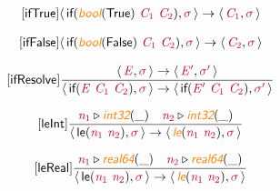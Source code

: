 \documentclass[10pt,leqno,fleqn]{article}
\newcommand{\artVariable}[1]{\mbox{\color{purple}\em #1\/}}
\newcommand{\artConstructor}[1]{\mbox{\sf #1}}
\newcommand{\artSpecial}[1]{\mbox{\color{orange}\sf\em #1}}
\begin{document}
\begin{equation}
\tag*{[\artConstructor{\sf ifTrue}]}
\begin{split}\langle\, \artConstructor{\sf if}(\artSpecial{bool}(\artConstructor{\sf True})\ \artVariable{C$_{1}$}\ \artVariable{C$_{2}$}), \artVariable{$\sigma$}\,\rangle \rightarrow \langle\, \artVariable{C$_{1}$}, \artVariable{$\sigma$}\,\rangle 
\end{split}
\end{equation}

\begin{equation}
\tag*{[\artConstructor{\sf ifFalse}]}
\begin{split}\langle\, \artConstructor{\sf if}(\artSpecial{bool}(\artConstructor{\sf False})\ \artVariable{C$_{1}$}\ \artVariable{C$_{2}$}), \artVariable{$\sigma$}\,\rangle \rightarrow \langle\, \artVariable{C$_{2}$}, \artVariable{$\sigma$}\,\rangle 
\end{split}
\end{equation}

\begin{equation}
\tag*{[\artConstructor{\sf ifResolve}]}
\begin{split}\frac{\langle\, \artVariable{E}, \artVariable{$\sigma$}\,\rangle \rightarrow \langle\, \artVariable{E\/$^\prime$}, \artVariable{$\sigma$\/$^\prime$}\,\rangle }{\langle\, \artConstructor{\sf if}(\artVariable{E}\ \artVariable{C$_{1}$}\ \artVariable{C$_{2}$}), \artVariable{$\sigma$}\,\rangle \rightarrow \langle\, \artConstructor{\sf if}(\artVariable{E\/$^\prime$}\ \artVariable{C$_{1}$}\ \artVariable{C$_{2}$}), \artVariable{$\sigma$\/$^\prime$}\,\rangle }
\end{split}
\end{equation}

\begin{equation}
\tag*{[\artConstructor{\sf leInt}]}
\begin{split}\frac{ \artVariable{n$_{1}$}\triangleright \artSpecial{int32}(\_) \quad  \artVariable{n$_{2}$}\triangleright \artSpecial{int32}(\_) }{\langle\, \artConstructor{\sf le}(\artVariable{n$_{1}$}\ \artVariable{n$_{2}$}), \artVariable{$\sigma$}\,\rangle \rightarrow \langle\, \artSpecial{le}(\artVariable{n$_{1}$}\ \artVariable{n$_{2}$}), \artVariable{$\sigma$}\,\rangle }
\end{split}
\end{equation}

\begin{equation}
\tag*{[\artConstructor{\sf leReal}]}
\begin{split}\frac{ \artVariable{n$_{1}$}\triangleright \artSpecial{real64}(\_) \quad  \artVariable{n$_{2}$}\triangleright \artSpecial{real64}(\_) }{\langle\, \artConstructor{\sf le}(\artVariable{n$_{1}$}\ \artVariable{n$_{2}$}), \artVariable{$\sigma$}\,\rangle \rightarrow \langle\, \artSpecial{le}(\artVariable{n$_{1}$}\ \artVariable{n$_{2}$}), \artVariable{$\sigma$}\,\rangle }
\end{split}
\end{equation}
\end{document}
